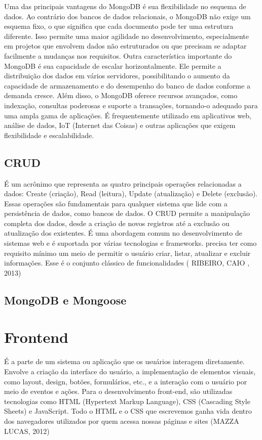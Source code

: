 Uma das principais vantagens do MongoDB é sua flexibilidade no esquema de dados. Ao contrário dos bancos de dados relacionais, o MongoDB não exige um esquema fixo, o que significa que cada documento pode ter uma estrutura diferente. Isso permite uma maior agilidade no desenvolvimento, especialmente em projetos que envolvem dados não estruturados ou que precisam se adaptar facilmente a mudanças nos requisitos.
Outra característica importante do MongoDB é sua capacidade de escalar horizontalmente. Ele permite a distribuição dos dados em vários servidores, possibilitando o aumento da capacidade de armazenamento e do desempenho do banco de dados conforme a demanda cresce.
Além disso, o MongoDB oferece recursos avançados, como indexação, consultas poderosas e suporte a transações, tornando-o adequado para uma ampla gama de aplicações. É frequentemente utilizado em aplicativos web, análise de dados, IoT (Internet das Coisas) e outras aplicações que exigem flexibilidade e escalabilidade.

\subsection{CRUD}
É um acrônimo que representa as quatro principais operações relacionadas a dados: Create (criação), Read (leitura), Update (atualização) e Delete (exclusão). Essas operações são fundamentais para qualquer sistema que lide com a persistência de dados, como bancos de dados. O CRUD permite a manipulação completa dos dados, desde a criação de novos registros até a exclusão ou atualização dos existentes. É uma abordagem comum no desenvolvimento de sistemas web e é suportada por várias tecnologias e frameworks.  precisa ter como requisito mínimo um meio de permitir o usuário criar, listar, atualizar e excluir informações. Esse é o conjunto clássico de funcionalidades ( RIBEIRO, CAIO , 2013)

\subsection{MongoDB e Mongoose}


\section{Frontend}
É a parte de um sistema ou aplicação que os usuários interagem diretamente. Envolve a criação da interface do usuário, a implementação de elementos visuais, como layout, design, botões, formulários, etc., e a interação com o usuário por meio de eventos e ações. Para o desenvolvimento front-end, são utilizadas tecnologias como HTML (Hypertext Markup Language), CSS (Cascading Style Sheets) e JavaScript. Todo o HTML e o CSS que escrevemos ganha vida dentro dos navegadores utilizados por quem acessa nossas páginas e sites (MAZZA LUCAS, 2012)

